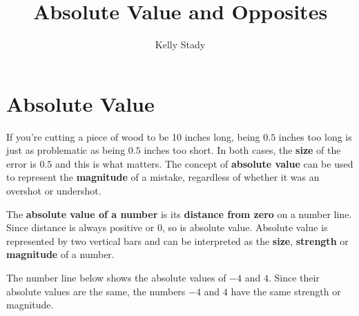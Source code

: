 \documentclass{ximera}[font=12pt]
\title{Absolute Value and Opposites}   %
\author{Kelly Stady}
\begin{document}
   

\begin{abstract}
    
\end{abstract}


\maketitle

\label{xim:AbsValue}


\section*{Absolute Value}

If you're cutting a piece of wood to be 10 inches long, being $0.5$ inches too long is just as problematic as being $0.5$ inches too short. In 
both cases, the \textbf{size} of the error is $0.5$ and this is what matters.  The concept of \textbf{absolute value} can be used to represent the \textbf{magnitude} of a mistake, regardless 
of whether it was an overshot or undershot.

The \textbf{absolute value of a number} is its \textbf{distance from zero} on a number line.  Since distance is always positive or 0, so is 
absolute value.  Absolute value is represented by two vertical bars and can be interpreted as the \textbf{size}, \textbf{strength} or 
\textbf{magnitude} of a number.

The number line below shows the absolute values of $-4$ and $4.$  Since their absolute values are the same, the numbers $-4$ and $4$ have the same strength or magnitude.
\end{document}
